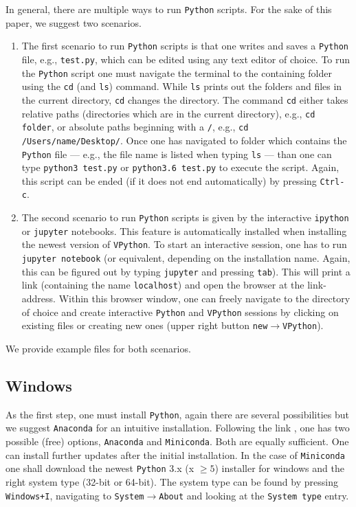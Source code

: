 \documentclass[12pt,ngerman,american]{iopart}
\newcommand{\python}[0]{\texttt{Python}}
\newcommand{\vpython}[0]{\texttt{VPython}}
\newcommand{\code}[1]{{\scriptsize\colorbox{light-gray}{\texttt{#1}}}}
\begin{document}
In general, there are multiple ways to run \python{} scripts.
For the sake of this paper, we suggest two scenarios.
\begin{enumerate}
\item The first scenario to run \python{} scripts is that one writes and saves a \python{} file, e.g., \texttt{test.py}, which can be edited using any text editor of choice.
	To run the \python{} script one must navigate the terminal to the containing folder using the \code{cd} (and \code{ls}) command.
	While \code{ls} prints out the folders and files in the current directory, \code{cd} changes the directory.
	The command \code{cd} either takes relative paths (directories which are in the current directory), e.g., \code{cd folder}, or absolute paths beginning with a \code{/}, e.g., \code{cd /Users/name/Desktop/}.
	Once one has navigated to folder which contains the \python{} file --- e.g., the file name is listed when typing \code{ls} --- than one can type \code{python3 test.py} or \code{python3.6 test.py} to execute the script.
	Again, this script can be ended (if it does not end automatically) by pressing \texttt{Ctrl-c}.
\item The second scenario to run \python{} scripts is given by the interactive \texttt{ipython} or \texttt{jupyter} notebooks.
	This feature is automatically installed when installing the newest version of \vpython{}.
	To start an interactive session, one has to run \code{jupyter notebook} (or equivalent, depending on the installation name. Again, this can be figured out by typing \code{jupyter} and pressing \texttt{tab}).
	This will print a link (containing the name \texttt{localhost}) and open the browser at the link-address.
	Within this browser window, one can freely navigate to the directory of choice and create interactive \python{} and \vpython{} sessions by clicking on existing files or creating new ones (upper right button \texttt{new}$\rightarrow$\vpython{}).
\end{enumerate}
We provide example files for both scenarios.

\subsection{Windows}\label{appendix:python-windows}

As the first step, one must install \python{}, again there are several possibilities but we suggest \texttt{Anaconda} for an intuitive installation.
Following the link \cite{conda}, one has two possible (free) options, \texttt{Anaconda} and \texttt{Miniconda}.
Both are equally sufficient.
One can install further updates after the initial installation.
In the case of \texttt{Miniconda} \cite{Miniconda} one shall download the newest \python{} 3.x (x $\geq5$) installer for windows and the right system type (32-bit or 64-bit).
The system type can be found by pressing \texttt{Windows+I}, navigating to \texttt{System}$\rightarrow$\texttt{About} and looking at the \texttt{System type} entry.
\end{document}
